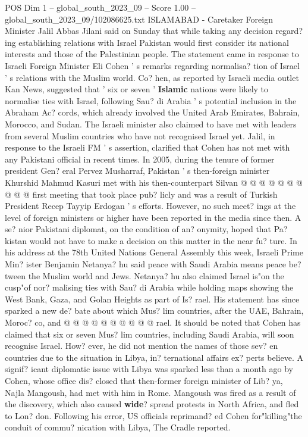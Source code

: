 \begin{textsample}{POS Dim 1 – global\_south\_2023\_09 – Score 1.00 – global\_south\_2023\_09/102086625.txt}  \label{ex:f1_pos_435}
ISLAMABAD - Caretaker Foreign Minister Jalil Abbas Jilani said on Sunday that while taking any decision regard? ing establishing relations with Israel Pakistan would first consider its national interests and those of the Palestinian people.
The statement came in response to Israeli Foreign Minister Eli Cohen ' s remarks regarding normalisa? tion of Israel ' s relations with the Muslim world.
Co? hen, as reported by Israeli media outlet Kan News, suggested that ' six or seven ' \textbf{Islamic} nations were likely to normalise ties with Israel, following Sau? di Arabia ' s potential inclusion in the Abraham Ac? cords, which already involved the United Arab Emirates, Bahrain, Morocco, and Sudan.
The Israeli minister also claimed to have met with leaders from several Muslim countries who have not recognised Israel yet.
Jalil, in response to the Israeli FM ' s assertion, clarified that Cohen has not met with any Pakistani official in recent times.
In 2005, during the tenure of former president Gen? eral Pervez Musharraf, Pakistan ' s then-foreign minister Khurshid Mahmud Kasuri met with his then-counterpart Silvan @ @ @ @ @ @ @ @ @ @ first meeting that took place pub? licly and was a result of Turkish President Recep Tayyip Erdogan ' s efforts.
However, no such meet? ings at the level of foreign ministers or higher have been reported in the media since then.
A se? nior Pakistani diplomat, on the condition of an? onymity, hoped that Pa? kistan would not have to make a decision on this matter in the near fu? ture.
In his address at the 78th United Nations General Assembly this week, Israeli Prime Min? ister Benjamin Netanya? hu said peace with Saudi Arabia means peace be? tween the Muslim world and Jews.
Netanya? hu also claimed Israel is"on the cusp"of nor? malising ties with Sau? di Arabia while holding maps showing the West Bank, Gaza, and Golan Heights as part of Is? rael.
His statement has since sparked a new de? bate about which Mus? lim countries, after the UAE, Bahrain, Moroc? co, and @ @ @ @ @ @ @ @ @ @ rael.
It should be noted that Cohen has claimed that six or seven Mus? lim countries, including Saudi Arabia, will soon recognise Israel.
How? ever, he did not mention the names of those sev? en countries due to the situation in Libya, in? ternational affairs ex? perts believe.
A signif? icant diplomatic issue with Libya was sparked less than a month ago by Cohen, whose office dis? closed that then-former foreign minister of Lib? ya, Najla Mangoush, had met with him in Rome.
Mangoush was fired as a result of the discovery, which also caused \textbf{wide}? spread protests in North Africa, and fled to Lon? don.
Following his error, US officials reprimand? ed Cohen for"killing"the conduit of commu? nication with Libya, The Cradle reported.

\end{textsample}
